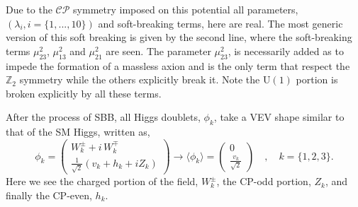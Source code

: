 \documentclass[10pt]{book}
\renewcommand{\(}{\left(}
\renewcommand{\)}{\right)}
\renewcommand{\[}{\left[}
\renewcommand{\]}{\right]}
\begin{document}
%
Due to the $\mathcal{CP}$ symmetry imposed on this potential all parameters, $(\lambda_i,i=\{1,...,10\})$ and soft-breaking terms, here are real.
%
The most generic version of this soft breaking is given by the second line, where the soft-breaking terms $\mu_{23}^2$, $\mu_{13}^2$ and $\mu_{21}^2$ are seen. 
%
The parameter $\mu_{23}^2$, is necessarily added as to impede the formation of a massless axion and is the only term that respect the $\mathbb{Z}_2$ symmetry while the others explicitly break it. Note the  $\mathrm{U(1)}$ portion is broken explicitly by all these terms. 
%
%
%

After the process of SBB, all Higgs doublets, $\phi_k$, take a VEV shape similar to that of the SM Higgs, written as, 
%
\begin{equation}
\phi_k = 
\begin{pmatrix}
W_k^\pm + i \, W_k^\mp \\ 
\frac{1}{\sqrt{2}}\left( v_k + h_k + i Z_k \right)
\end{pmatrix}  \rightarrow \langle \phi_k \rangle = \begin{pmatrix}
0 \\ 
\frac{v_k}{\sqrt{2}}
\end{pmatrix} \quad , \quad k=\{ 1,2,3\} .  
\label{eq:3HDM_Higgs_Field_VEV} 
\end{equation} 
%
Here we see the charged portion of the field, $W_k^\pm$, the CP-odd portion, $Z_k$, and finally the CP-even, $h_k$. 
%
%
\end{document}
